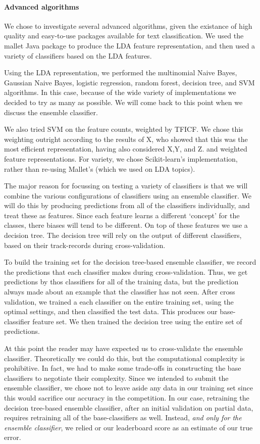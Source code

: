 \documentclass[conference,letterpaper]{IEEEtran}
\begin{document}
\paragraph{Advanced algorithms}
We chose to investigate several advanced algorithms, given the existance of
high quality and easy-to-use packages available for text classification.
We used the mallet Java package to produce the LDA feature representation, 
and then used a variety of classifiers based on the LDA features.

Using the LDA representation, we performed the multinomial Naive 
Bayes, Gaussian Naive Bayes, logistic regression, random forest, decision tree,
and SVM algorithms.  In this case, because of the wide variety of 
implementations we decided to try as many as possible.  We will come back to
this point when we discuss the ensemble classifier.  

We also tried SVM on the feature counts, weighted by TFICF.  We chose this 
weighting outright according to the results of X, who showed that this was
the most efficient representation, having also considered X,Y, and Z.  and 
weighted feature representations.  For variety, we chose Scikit-learn's 
implementation, rather than re-using Mallet's (which we used on LDA topics).

The major reason for focussing on testing a variety of classifiers is that
we will combine the various configurations of classifiers using an ensemble
classifier.  We will do this by producing predictions from all of the 
classifiers individually, and treat these as features.  Since each 
feature learns a different `concept' for the classes, there biases will
tend to be different.  On top of these features we use a decision tree.
The decision tree will rely on the output of different classifiers, based 
on their track-records during cross-validation.

To build the training set for the decision tree-based ensemble classifier,
we record the predictions that each classifier makes during cross-validation.
Thus, we get predictions by thos classifiers for all of the training data,
but the prediction always made about an example that the classifier has 
not seen.  After cross validation, we trained a each classifier on the
entire training set, using the optimal settings, and then classified the test
data.  This produces our base-classifier feature set.  We then  
trained the decision tree using the entire set of predictions.

At this point the reader may have expected us to cross-validate the 
ensemble classifier.  Theoretically we could do this, but the computational
complexity is prohibitive.  In fact, we had to make some trade-offs in 
constructing the base classifiers to negotiate their complexity.  Since we
intended to submit the ensemble classifier, we chose not to leave aside any
data in our training set since this would sacrifice our accuracy in the
competition.  In our case, retraining the decision tree-based ensemble
classifier, after an initial validation on partial data, requires
retraining all of the base-classifiers as well.  Instead, 
\textit{and only for the ensemble classifier}, we relied or our leaderboard 
score as an estimate of our true error.
\end{document}
